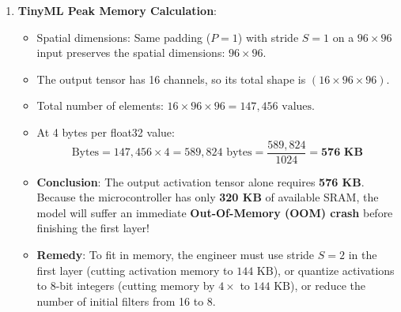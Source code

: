 \begin{enumerate}
    \item \textbf{TinyML Peak Memory Calculation}:
    \begin{itemize}
        \item Spatial dimensions: Same padding ($P=1$) with stride $S=1$ on a $96 \times 96$ input preserves the spatial dimensions: $96 \times 96$.
        \item The output tensor has 16 channels, so its total shape is $(16 \times 96 \times 96)$.
        \item Total number of elements: $16 \times 96 \times 96 = 147{,}456 \text{ values}$.
        \item At 4 bytes per float32 value:
        \begin{equation*}
        \text{Bytes} = 147{,}456 \times 4 = 589{,}824 \text{ bytes} = \frac{589{,}824}{1024} = \mathbf{576 \text{ KB}}
        \end{equation*}
        \item \textbf{Conclusion}: The output activation tensor alone requires \textbf{576 KB}. Because the microcontroller has only \textbf{320 KB} of available SRAM, the model will suffer an immediate \textbf{Out-Of-Memory (OOM) crash} before finishing the first layer!
        \item \textbf{Remedy}: To fit in memory, the engineer must use stride $S=2$ in the first layer (cutting activation memory to $144\text{ KB}$), or quantize activations to 8-bit integers (cutting memory by $4\times$ to $144\text{ KB}$), or reduce the number of initial filters from 16 to 8.
    \end{itemize}
\end{enumerate}
